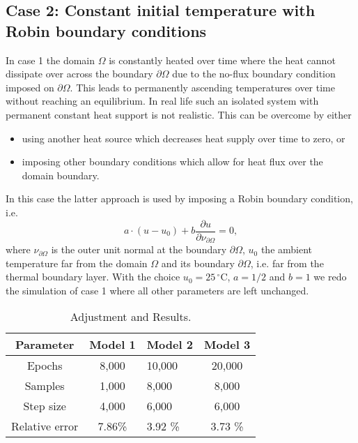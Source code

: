\documentclass[a4paper,11pt]{article}
\begin{document}
\subsection{Case 2: Constant initial temperature with Robin boundary conditions}
In case 1 the domain $\Omega$ is constantly heated over time where the heat cannot dissipate over across the boundary $\partial \Omega $ due to the no-flux boundary condition imposed on $\partial \Omega $. This leads to permanently ascending temperatures over time without reaching an equilibrium. In real life such an isolated system with permanent constant heat support is not realistic. This can be overcome by either
\begin{itemize}
\item using another heat source which decreases heat supply over time to zero, or
\item imposing other boundary conditions which allow for heat flux over the domain boundary.
\end{itemize}
In this case the latter approach is used by imposing a Robin boundary condition, i.e.
\begin{equation*}
a\cdot(u-u_0 ) + b\frac{\partial u}{\partial \nu_{\partial \Omega}} = 0,
\end{equation*}
where $  \nu_{\partial \Omega} $ is the outer unit normal at the boundary $\partial \Omega $, $u_0 $ the ambient temperature far from the domain $\Omega $ and its boundary $\partial \Omega $, i.e. far from the thermal boundary layer.
With the choice $u_0 = 25\,^{\circ}\mathrm{C} $, $a=1/2 $ and $ b=1 $ we redo the simulation of case 1 where all other parameters are left unchanged.
\begin{table}[h!] 
\centering
{ \renewcommand{\arraystretch}{1.4}
\begin{tabular}{cclc}
\toprule
\textbf{Parameter} & \textbf{Model 1} & \textbf{Model 2}& \textbf{Model 3}\\
\midrule
Epochs & 8,000 & 10,000 & 20,000\\
Samples & 1,000 & 8,000 & 8,000 \\
Step size & 4,000 & 6,000 & 6,000 \\
Relative error & 7.86\% & 3.92 \% & 3.73 \% \\
\bottomrule
\end{tabular}}
\caption{Adjustment and Results.}
\label{AdjustmentAndResults2}
\end{table}
\end{document}
